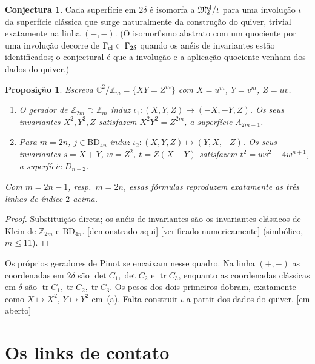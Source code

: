 \documentclass[11pt]{article}
\newtheorem{proposition}[theorem]{Proposição}
\theoremstyle{definition}
\newtheorem{conjecture}[theorem]{Conjectura}
\theoremstyle{remark}
\newcommand{\tagP}{\textsf{\small[demonstrado aqui]}}
\newcommand{\tagN}{\textsf{\small[verificado numericamente]}}
\newcommand{\tagO}{\textsf{\small\textcolor{red!70!black}{[em aberto]}}}
\newcommand{\C}{\mathbb{C}}\newcommand{\R}{\mathbb{R}}\newcommand{\Z}{\mathbb{Z}}
\newcommand{\M}{\mathfrak{M}}\newcommand{\Rep}{\mathrm{Rep}}\newcommand{\SRep}{\mathrm{SRep}}
\newcommand{\BD}{\mathrm{BD}}
\begin{document}
\begin{conjecture}\label{conj:C}
Cada superfície em $2\delta$ é isomorfa a $\M^{\rm cl}_\delta/\iota$ para uma involução $\iota$ da superfície clássica que surge naturalmente da construção do quiver, trivial exatamente na linha $(-,-)$. (O isomorfismo abstrato com um quociente por uma involução decorre de $\Gamma_{\rm cl}\subset\Gamma_{2\delta}$ quando os anéis de invariantes estão identificados; o conjectural é que a involução e a aplicação quociente venham dos dados do quiver.)
\end{conjecture}

\begin{proposition}\label{prop:rings}
Escreva $\C^2/\Z_m=\{XY=Z^m\}$ com $X=u^m$, $Y=v^m$, $Z=uv$.
\begin{enumerate}[label=(\alph*)]
\item O gerador de $\Z_{2m}\supset\Z_m$ induz $\iota_1:(X,Y,Z)\mapsto(-X,-Y,Z)$. Os seus invariantes $X^2,Y^2,Z$ satisfazem $X^2Y^2=Z^{2m}$, a superfície $A_{2m-1}$.
\item Para $m=2n$, $j\in\BD_{4n}$ induz $\iota_2:(X,Y,Z)\mapsto(Y,X,-Z)$. Os seus invariantes $s=X+Y$, $w=Z^2$, $t=Z(X-Y)$ satisfazem $t^2=ws^2-4w^{n+1}$, a superfície $D_{n+2}$.
\end{enumerate}
Com $m=2n-1$, resp.\ $m=2n$, essas fórmulas reproduzem exatamente as três linhas de índice $2$ acima.
\end{proposition}
\begin{proof}
Substituição direta; os anéis de invariantes são os invariantes clássicos de Klein de $\Z_{2m}$ e $\BD_{4n}$. \tagP{} \tagN{} (simbólico, $m\le11$).
\end{proof}

Os próprios geradores de Pinot se encaixam nesse quadro. Na linha $(+,-)$ as coordenadas em $2\delta$ são $\det C_1,\det C_2$ e $\operatorname{tr}C_3$, enquanto as coordenadas clássicas em $\delta$ são $\operatorname{tr}C_1,\operatorname{tr}C_2,\operatorname{tr}C_3$. Os pesos dos dois primeiros dobram, exatamente como $X\mapsto X^2$, $Y\mapsto Y^2$ em~(a). Falta construir $\iota$ a partir dos dados do quiver. \tagO

\section{Os links de contato}\label{sec:links}
\end{document}

